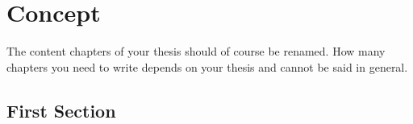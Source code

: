 \chapter{Concept}
\label{ch:Concept}

The content chapters of your thesis should of course be renamed. How many
chapters you need to write depends on your thesis and cannot be said in general.

\section{First Section}
\label{sec:Concept:FirstSection}
